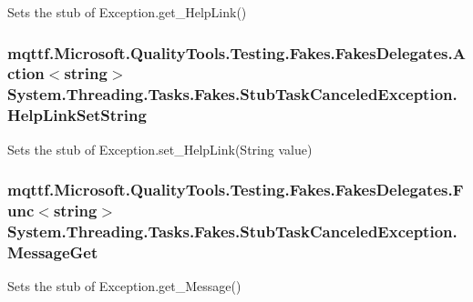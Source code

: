 Sets the stub of Exception.\-get\-\_\-\-Help\-Link()

\hypertarget{class_system_1_1_threading_1_1_tasks_1_1_fakes_1_1_stub_task_canceled_exception_a60ce5fe2a7ec91b5879f3ce2ea53a54c}{
\subsubsection[{Help\-Link\-Set\-String}]{\setlength{\rightskip}{0pt plus 5cm}mqttf.\-Microsoft.\-Quality\-Tools.\-Testing.\-Fakes.\-Fakes\-Delegates.\-Action$<$string$>$ System.\-Threading.\-Tasks.\-Fakes.\-Stub\-Task\-Canceled\-Exception.\-Help\-Link\-Set\-String}}\label{class_system_1_1_threading_1_1_tasks_1_1_fakes_1_1_stub_task_canceled_exception_a60ce5fe2a7ec91b5879f3ce2ea53a54c}


Sets the stub of Exception.\-set\-\_\-\-Help\-Link(\-String value)

\hypertarget{class_system_1_1_threading_1_1_tasks_1_1_fakes_1_1_stub_task_canceled_exception_ac7eb88b4141787f087b4c31ec572336b}{
\subsubsection[{Message\-Get}]{\setlength{\rightskip}{0pt plus 5cm}mqttf.\-Microsoft.\-Quality\-Tools.\-Testing.\-Fakes.\-Fakes\-Delegates.\-Func$<$string$>$ System.\-Threading.\-Tasks.\-Fakes.\-Stub\-Task\-Canceled\-Exception.\-Message\-Get}}\label{class_system_1_1_threading_1_1_tasks_1_1_fakes_1_1_stub_task_canceled_exception_ac7eb88b4141787f087b4c31ec572336b}


Sets the stub of Exception.\-get\-\_\-\-Message()

